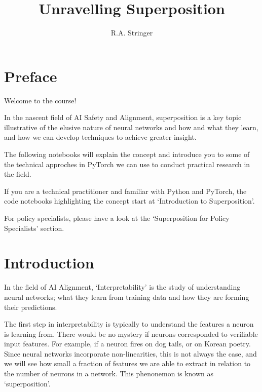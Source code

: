 \documentclass[
  letterpaper,
  DIV=11,
  numbers=noendperiod]{scrreprt}
\title{Unravelling Superposition}
\author{R.A. Stringer}
\date{}
\renewcommand*\contentsname{Table of contents}
\newcommand\contentsname{Table of contents}
\begin{document}
\maketitle

\renewcommand*\contentsname{Table of contents}
{
\hypersetup{linkcolor=}
\setcounter{tocdepth}{2}
\tableofcontents
}


\chapter*{Preface}\label{preface}


Welcome to the course!

In the nascent field of AI Safety and Alignment, superposition is a key
topic illustrative of the elusive nature of neural networks and how and
what they learn, and how we can develop techniques to achieve greater
insight.

The following notebooks will explain the concept and introduce you to
some of the technical approches in PyTorch we can use to conduct
practical research in the field.

If you are a technical practitioner and familiar with Python and
PyTorch, the code notebooks highlighting the concept start at
`Introduction to Superposition'.

For policy specialists, please have a look at the `Superposition for
Policy Specialists' section.


\chapter{Introduction}\label{introduction}

In the field of AI Alignment, `Interpretability' is the study of
understanding neural networks; what they learn from training data and
how they are forming their predictions.

The first step in interpretability is typically to understand the
features a neuron is learning from. There would be no mystery if neurons
corresponded to verifiable input features. For example, if a neuron
fires on dog tails, or on Korean poetry. Since neural networks
incorporate non-linearities, this is not always the case, and we will
see how small a fraction of features we are able to extract in relation
to the number of neurons in a network. This phenonemon is known as
`superposition'.
\end{document}
